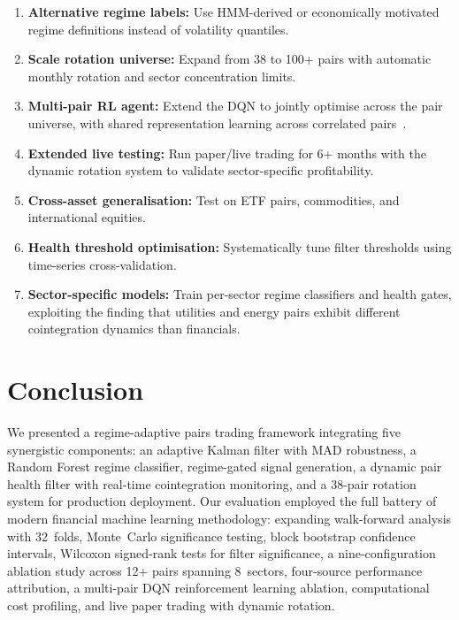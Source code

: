 \documentclass{ieeeaccess}
\begin{document}
\begin{enumerate}
    \item \textbf{Alternative regime labels:} Use HMM-derived or economically motivated regime definitions instead of volatility quantiles.
    \item \textbf{Scale rotation universe:} Expand from 38 to 100+ pairs with automatic monthly rotation and sector concentration limits.
    \item \textbf{Multi-pair RL agent:} Extend the DQN to jointly optimise across the pair universe, with shared representation learning across correlated pairs~\cite{zhang2024reinforcement}.
    \item \textbf{Extended live testing:} Run paper/live trading for 6+ months with the dynamic rotation system to validate sector-specific profitability.
    \item \textbf{Cross-asset generalisation:} Test on ETF pairs, commodities, and international equities.
    \item \textbf{Health threshold optimisation:} Systematically tune filter thresholds using time-series cross-validation.
    \item \textbf{Sector-specific models:} Train per-sector regime classifiers and health gates, exploiting the finding that utilities and energy pairs exhibit different cointegration dynamics than financials.
\end{enumerate}

\section{Conclusion}
\label{sec:conclusion}

We presented a regime-adaptive pairs trading framework integrating five synergistic components: an adaptive Kalman filter with MAD robustness, a Random Forest regime classifier, regime-gated signal generation, a dynamic pair health filter with real-time cointegration monitoring, and a 38-pair rotation system for production deployment.
Our evaluation employed the full battery of modern financial machine learning methodology: expanding walk-forward analysis with 32~folds, Monte~Carlo significance testing, block bootstrap confidence intervals, Wilcoxon signed-rank tests for filter significance, a nine-configuration ablation study across 12+ pairs spanning 8~sectors, four-source performance attribution, a multi-pair DQN reinforcement learning ablation, computational cost profiling, and live paper trading with dynamic rotation.
\end{document}
